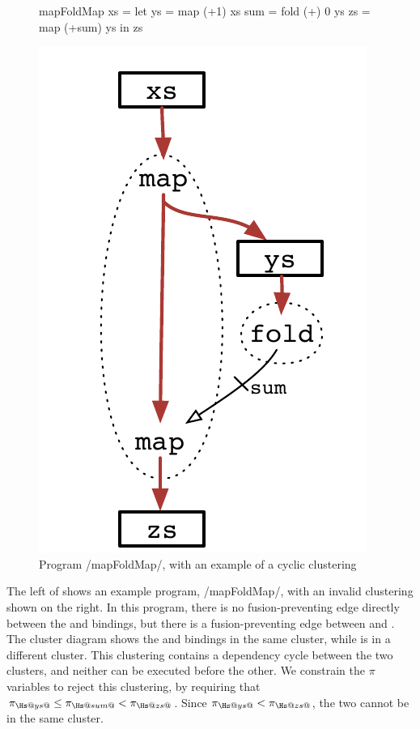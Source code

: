 \begin{figure}
\begin{minipage}{0.5\textwidth}
\begin{haskell}
mapFoldMap xs 
 = let ys  = map  (+1)   xs
       sum = fold (+) 0  ys
       zs  = map  (+sum) ys
   in  zs
\end{haskell}
\end{minipage}
\begin{minipage}{0.5\textwidth}
\begin{center}
\includegraphics[scale=0.5]{copy/03-body/clustering/figures/ex3-cyclic.pdf}
\end{center}
\end{minipage}
\caption{Program \Hs/mapFoldMap/, with an example of a cyclic clustering}
\label{clustering:f:cyclic}
\end{figure}


The left of  shows an example program, \Hs/mapFoldMap/, with an invalid clustering shown on the right.
In this program, there is no fusion-preventing edge directly between the \Hs@ys@ and \Hs@zs@ bindings, but there is a fusion-preventing edge between \Hs@sum@ and \Hs@zs@.
The cluster diagram shows the \Hs@ys@ and \Hs@zs@ bindings in the same cluster, while \Hs@sum@ is in a different cluster.
This clustering contains a dependency cycle between the two clusters, and neither can be executed before the other.
We constrain the $\pi$ variables to reject this clustering, by requiring that $\pi_{\Hs@ys@} \le \pi_{\Hs@sum@} < \pi_{\Hs@zs@}$.
Since $\pi_{\Hs@ys@} < \pi_{\Hs@zs@}$, the two cannot be in the same cluster.

